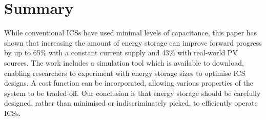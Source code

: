 \section{Summary} \label{sec:c3_summary}

While conventional ICSs have used minimal levels of capacitance, this paper has shown that increasing the amount of energy storage can improve forward progress by up to 65\% with a constant current supply and 43\% with real-world PV sources. 
The work includes a simulation tool which is available to download, enabling researchers to experiment with energy storage sizes to optimise ICS designs. 
A cost function can be incorporated, allowing various properties of the system to be traded-off. 
Our conclusion is that energy storage should be carefully designed, rather than minimised or indiscriminately picked, to efficiently operate ICSs. 


